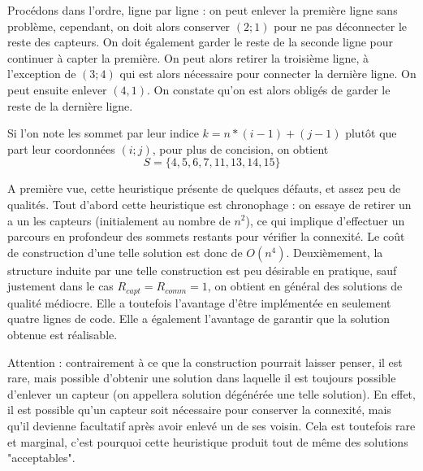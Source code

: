 \documentclass[12pt,a4paper]{article}
\begin{document}
Procédons dans l'ordre, ligne par ligne :  on peut enlever la première ligne sans problème, cependant, on doit alors conserver $(2;1)$ pour ne pas déconnecter le reste des capteurs. On doit également garder le reste de la seconde ligne pour continuer à capter la première. On peut alors retirer la troisième ligne, à l'exception de $(3;4)$ qui est alors nécessaire pour connecter la dernière ligne. On peut ensuite enlever $(4,1)$. On constate qu'on est alors obligés de garder le reste de la dernière ligne.

Si l'on note les sommet par leur indice $k=n*(i-1)+(j-1)$ plutôt que part leur coordonnées $(i;j)$, pour plus de concision, on obtient
\[S=\{4,5,6,7,11,13,14,15\}\]

A première vue, cette heuristique présente de quelques défauts, et assez peu de qualités. Tout d'abord cette heuristique est chronophage : on essaye de retirer un a un les capteurs (initialement au nombre de $n^2$), ce qui implique d'effectuer un parcours en profondeur des sommets restants pour vérifier la connexité. Le coût de construction d'une telle solution est donc de $O(n^4)$. Deuxièmement, la structure induite par une telle construction est peu désirable en pratique, sauf justement dans le cas $R_{capt}=R_{comm}=1$, on obtient en général des solutions de qualité médiocre. Elle a toutefois l'avantage d'être implémentée en seulement quatre lignes de code. Elle a également l'avantage de garantir que la solution obtenue est réalisable. 

Attention : contrairement à ce que la construction pourrait laisser penser, il est rare, mais possible d'obtenir une solution dans laquelle il est toujours possible d'enlever un capteur (on appellera solution dégénérée une telle solution). En effet, il est possible qu'un capteur soit nécessaire pour conserver la connexité, mais qu'il devienne facultatif après avoir enlevé un de ses voisin. Cela est toutefois rare et marginal, c'est pourquoi cette heuristique produit tout de même des solutions "acceptables".
\end{document}
